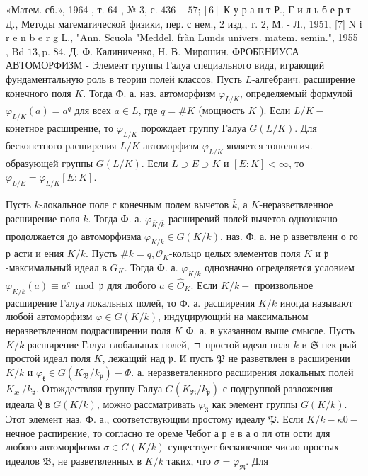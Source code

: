 \documentclass[10pt]{article}
\begin{document}
«Матем. сб.», 1964 , т. 64 , № 3, с. $436-57 ;[6]$ К у р а н т Р., Г и л ь б е р т Д., Методы математической физики, пер. с нем., 2 изд., т. 2, М. - Л., 1951, [7] N i r e n b e r g L., "Ann. Scuola "Meddel. fràn Lunds univers. matem. semin.", 1955 , Bd $13, \mathrm{p}$. 84. Д. Ф. Калиниченко, Н. В. Мирошин. ФРОБЕНИУСА АВТОМОРФИЗМ - Элемент группы Галуа специального вида, играющий фундаментальную роль в теории полей классов. Пусть $L$-алгебраич. расширение конечного поля $K$. Тогда Ф. а. наз. автоморфизм $\varphi_{L / K}$, определяемый формулой $\varphi_{L / K}(a)=a^{q}$ для всех $a \in L$, где $q=\# K$ (мощность $K$ ). Если $L / K-$ конетное расширение, то $\varphi_{L / K}$ порождает группу Галуа $G(L / K)$. Для бесконетного расширения $L / K$ автоморфизм $\varphi_{L / K}$ является топологич. образующей группы $G(L / K)$. Если $L \supset E \supset K$ и $[E: K]<\infty$, то $\varphi_{L / E}=\varphi_{L / K}[E: K]$.



Пусть $k$-локальное поле с конечным полем вычетов $\bar{k}$, а $K$-неразветвленное расширение поля $k$. Тогда Ф. а. $\varphi_{\bar{K} / \bar{k}}$ расширевий полей вычетов однозначно продолжается до автоморфизма $\varphi_{K / k} \in G(K / k)$, наз. Ф. а. не р азветвленн о го р асти и ения $K / k$. Пусть $\# \bar{k}=q, \mathcal{O}_{K}$-кольцо целых элементов поля $K$ и $\mathfrak{p}$-максимальный идеал в $G_{K}$. Тогда Ф. а. $\varphi_{K / k}$ однозначно огределяется условием $\varphi_{K / k}(a) \equiv a^{q} \bmod \mathfrak{p}$ для любого $a \in \hat{O}_{K}$. Если $K / k-$ произвольное расширение Галуа локальных полей, то Ф. а. расширения $K / k$ иногда называют любой автоморфизм $\varphi \in G(K / k)$, индуцирующий на максимальном неразветвленном подрасширении поля $K$ Ф. а. в указанном выше смысле. Пусть $K / k$-расширение Галуа глобальных полей, ㄱ-простой идеал поля $k$ и $\mathfrak{S}$-нек-рый простой идеал поля $K$, лежащий над $\mathfrak{p}$. И пусть $\mathfrak{P}$ не разветвлен в расширении $K / k$ и $\varphi_{\mathfrak{k}} \in G\left(K_{\mathfrak{B}} / k_{\mathfrak{p}}\right)-\Phi$. а. неразветвленного расширения локальных полей $K_{\text {æ }} / k_{\mathfrak{p}}$. Отождествляя группу Галуа $G\left(K_{\mathfrak{\Re}} / k_{\mathfrak{p}}\right)$ с подгруппой разложения идеала ऐ в $G(K / k)$, можно рассматривать $\varphi_{3}$ как элемент группы $G(K / k)$. Этот элемент наз. Ф. а., соответствующим простому идеалу $\mathfrak{P}$. Если $K / k-\kappa 0-$ нечное распирение, то согласно те ореме Чебот а р е в а о пл отн ости для любого автоморфизма $\sigma \in G(K / k)$ существует бесконечное число простых идеалов $\mathfrak{B}$, не разветвленных в $K / k$ таких, что $\sigma=\varphi_{\mathfrak{R}}$. Для
\end{document}
